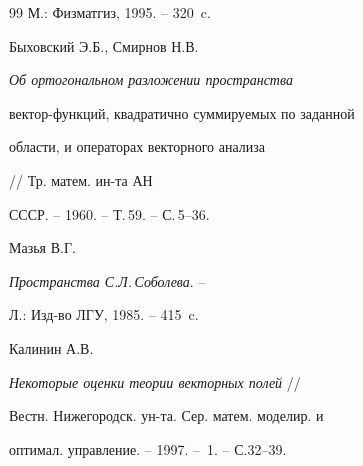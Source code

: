 \begin{thebibliography}{99}
М.: Физматгиз, 1995. -- 320~c.







Быховский Э.Б., Смирнов Н.В. {\em Об ортогональном разложении пространства


вектор-функций, квадратично суммируемых по заданной


области, и операторах векторного анализа} // Тр. матем. ин-та АН


СССР. -- 1960. -- Т.\,59. -- С.\,5--36.







Мазья В.Г.


{\em Пространства С.Л.\,Соболева}. --


Л.: Изд-во ЛГУ, 1985. -- 415~c.







Калинин А.В.


{\em Некоторые оценки теории векторных полей} //


Вестн. Нижегородск. ун-та. Сер. матем. моделир. и


оптимал. управление. -- 1997. -- \No\,1. -- С.32--39.








\end{thebibliography}





\vskip 2cm












\label{end}











